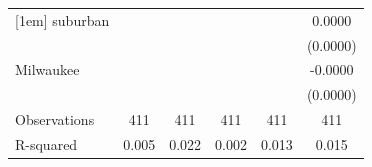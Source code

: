 {\begin{tabular}{l*{5}{c}}
[1em]
suburban            &                     &                     &                     &                     &      0.0000         \\
                    &                     &                     &                     &                     &    (0.0000)         \\
[1em]
Milwaukee           &                     &                     &                     &                     &     -0.0000\sym{**} \\
                    &                     &                     &                     &                     &    (0.0000)         \\
\hline
Observations        &         411         &         411         &         411         &         411         &         411         \\
R-squared           &       0.005         &       0.022         &       0.002         &       0.013         &       0.015         \\
\hline\hline
\end{tabular}
}
